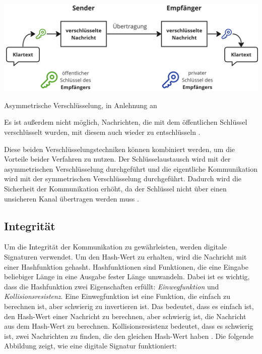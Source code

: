 \begin{center}
    \captionsetup{type=figure}
    \includegraphics[width=1\linewidth]{images/asymmetric_encryption.png}
    \caption{Asymmetrische Verschlüsselung, in Anlehnung an \cite{ElektronikKompendium_asymmetrischeVerschluesselung}}
    \label{fig:asymmetrische_verschluesselung}
\end{center}

\noindent Es ist außerdem nicht möglich, Nachrichten, die mit dem öffentlichen Schlüssel verschlüsselt wurden, mit diesem auch wieder zu entschlüsseln \parencite{ElektronikKompendium_asymmetrischeVerschluesselung}. 

Diese beiden Verschlüsselungstechniken können kombiniert werden, um die Vorteile beider Verfahren zu nutzen. Der Schlüsselaustausch wird mit der asymmetrischen Verschlüsselung durchgeführt und die eigentliche Kommunikation wird mit der symmetrischen Verschlüsselung durchgeführt. Dadurch wird die Sicherheit der Kommunikation erhöht, da der Schlüssel nicht über einen unsicheren Kanal übertragen werden muss \Parencite[S. 5-8]{Wong_KryptoPraxis}. 


\subsection{Integrität}
\label{subsec:integritaet_signatur}

Um die Integrität der Kommunikation zu gewährleisten, werden digitale Signaturen verwendet. Um den Hash-Wert zu erhalten, wird die Nachricht mit einer Hashfunktion gehasht. Hashfunktionen sind Funktionen, die eine Eingabe beliebiger Länge in eine Ausgabe fester Länge umwandeln. Dabei ist es wichtig, dass die Hashfunktion zwei Eigenschaften erfüllt: \textit{Einwegfunktion} und \textit{Kollisionsresistenz}. Eine Einwegfunktion ist eine Funktion, die einfach zu berechnen ist, aber schwierig zu invertieren ist. Das bedeutet, dass es einfach ist, den Hash-Wert einer Nachricht zu berechnen, aber schwierig ist, die Nachricht aus dem Hash-Wert zu berechnen. Kollisionsresistenz bedeutet, dass es schwierig ist, zwei Nachrichten zu finden, die den gleichen Hash-Wert haben \parencite[S. 13-15]{Brünnler_BlockchainKurzGut}. Die folgende Abbildung zeigt, wie eine digitale Signatur funktioniert:


